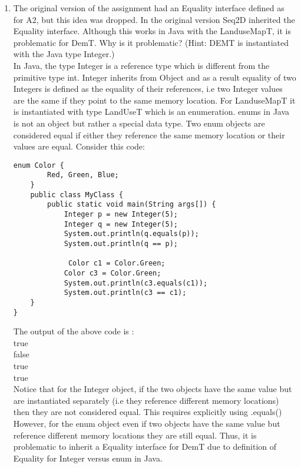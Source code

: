 \documentclass[12pt]{article}
\begin{document}
\begin{enumerate}
\item The original version of the assignment had an Equality interface defined
  as for A2, but this idea was dropped.  In the original version Seq2D inherited
  the Equality interface.  Although this works in Java with the LanduseMapT, it is
  problematic for DemT.  Why is it problematic?  (Hint: DEMT is instantiated
  with the Java type Integer.)\\
  
  In Java, the type Integer is a reference type which is different from the primitive type int. Integer inherits from Object and as a result equality of two Integers is defined as the equality of their references, i.e two Integer values are the same if they point to the same memory location. For LanduseMapT it is instantiated with type LandUseT which is an enumeration. enums in Java is not an object but rather a special data type. Two enum objects are considered equal if either they reference the same memory location or their values are equal. Consider this code:
  \begin{verbatim}
enum Color {
    	Red, Green, Blue;
	}
	public class MyClass {
    	public static void main(String args[]) {
      		Integer p = new Integer(5);
      		Integer q = new Integer(5);
      		System.out.println(q.equals(p));
      		System.out.println(q == p);
      
     		 Color c1 = Color.Green;
      		Color c3 = Color.Green;
      		System.out.println(c3.equals(c1));
      		System.out.println(c3 == c1);
    }
}
\end{verbatim}

The output of the above code is :\\
true\\
false\\
true\\
true\\

Notice that for the Integer object, if the two objects have the same value but are instantiated separately (i.e they reference different memory locations) then they are not considered equal. This requires explicitly using .equals()\\

However, for the enum object even if two objects have the same value but reference different memory locations they are still equal. Thus, it is problematic to inherit a Equality interface for DemT due to definition of Equality for Integer versus enum in Java.
  

\end{enumerate}
\end{document}
